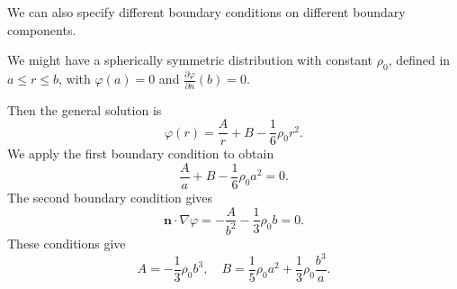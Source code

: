\documentclass[a4paper]{article}
\begin{document}
We can also specify different boundary conditions on different boundary components.

\begin{eg}
  We might have a spherically symmetric distribution with constant $\rho_0$, defined in $a \leq r \leq b$, with $\varphi(a) = 0$ and $\frac{\partial \varphi}{\partial n}(b) = 0$.

  Then the general solution is
  \[
    \varphi(r) = \frac{A}{r} + B - \frac{1}{6}\rho_0 r^2.
  \]
  We apply the first boundary condition to obtain
  \[
    \frac{A}{a} + B - \frac{1}{6}\rho_0 a^2 = 0.
  \]
  The second boundary condition gives
  \[
    \mathbf{n}\cdot \nabla \varphi = -\frac{A}{b^2} - \frac{1}{3}\rho_0 b = 0.
  \]
  These conditions give
  \[
    A = -\frac{1}{3}\rho_0 b^3, \quad B = \frac{1}{5}\rho_0 a^2 + \frac{1}{3}\rho_0 \frac{b^3}{a}.
  \]
\end{eg}
\end{document}
